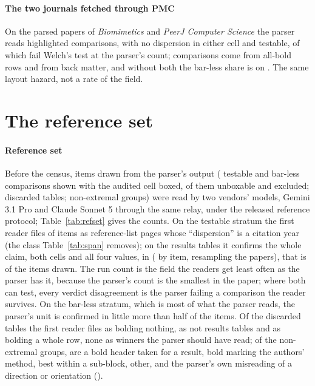 \documentclass[preprint,review,12pt]{elsarticle}
\begin{document}
\paragraph{The two journals fetched through PMC} On the \nPmParserPapers{} parsed papers of \emph{Biomimetics} and \emph{PeerJ Computer Science} the parser reads \nPmParserComparisons{} highlighted comparisons, \nPmParserPctNeither{} with no dispersion in either cell and \nPmParserPctTestable{} testable, of which \nPmParserPctFail{} fail Welch's test at the parser's count; \nPmParserRowBoldComparisons{} comparisons come from all-bold rows and \nPmParserBackMatterComparisons{} from back matter, and without both the bar-less share is \nPmParserGenuineNeither{} on \nPmParserGenuineN{}. The same layout hazard, not a rate of the field.

\section{The reference set}
\label{app:refset}

\paragraph{Reference set} Before the census, \nGItemsN{} items drawn from the parser's output (\nGStratumTestable{} testable and \nGStratumNoBar{} bar-less comparisons shown with the audited cell boxed, \nGUnboxedN{} of them unboxable and excluded; \nGStratumDiscarded{} discarded tables; \nGStratumNonExtremal{} non-extremal groups) were read by two vendors' models, Gemini 3.1 Pro and Claude Sonnet 5 through the same relay, under the released reference protocol; Table~\ref{tab:refset} gives the counts. On the testable stratum the first reader files \nGTestableNotResults{} of \nGTestableRows{} items as reference-list pages whose ``dispersion'' is a citation year (the class Table~\ref{tab:span} removes); on the results tables it confirms the whole claim, both cells and all four values, in \nGClaimFrac{} (\nGClaim{} by item, \nGClaimPaperCi{} resampling the \nGClaimPapers{} papers), that is \nGClaimOfDrawnFrac{} of the items drawn. The run count is the field the readers get least often as the parser has it, because the parser's count is the smallest in the paper; where both can test, every verdict disagreement is the parser failing a comparison the reader survives. On the bar-less stratum, which is most of what the parser reads, the parser's unit is confirmed in little more than half of the items. Of the discarded tables the first reader files \nGDiscardedCauseNoBold{} as bolding nothing, \nGDiscardedCauseNotResults{} as not results tables and \nGDiscardedCauseWholeRowBold{} as bolding a whole row, none as winners the parser should have read; of the non-extremal groups, \nGNonExtremalCauseHeaderBold{} are a bold header taken for a result, \nGNonExtremalCauseOwnMethod{} bold marking the authors' method, \nGNonExtremalCauseSubclassBest{} best within a sub-block, \nGNonExtremalCauseOther{} other, and \nGNonExtremalCauseMisread{} the parser's own misreading of a direction or orientation (\nGNonExtremalExtractorAtFaultFrac{}).
\end{document}
